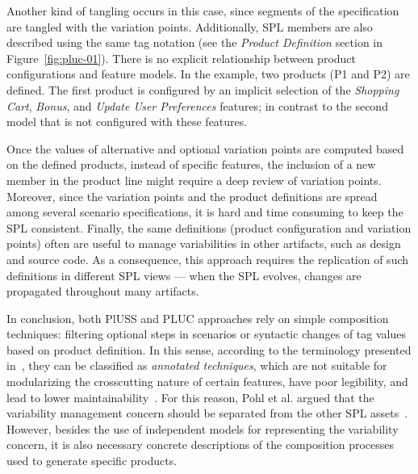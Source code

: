 \documentclass{acm_proc_article-sp}
\begin{document}
Another kind of tangling occurs in this case, since segments of the
specification are tangled with the variation points. Additionally, SPL members
are also described using the same tag notation (see the \emph{Product Definition}
section in Figure~\ref{fig:pluc-01}). There is no explicit relationship between
product configurations and feature models. In the example, two products (P1 and
P2) are defined. The first product is configured by an implicit selection of
the \emph{Shopping Cart}, \emph{Bonus}, and \emph{Update User Preferences}
features; in contrast to the second model that is not configured with these
features.

Once the values of alternative and optional variation points are computed based
on the defined products, instead of specific features, the inclusion of a new
member in the product line might require a deep review of variation points.
Moreover, since the variation points and the product definitions are spread among
several scenario specifications, it is hard and time consuming to keep the SPL
consistent. Finally, the same definitions (product configuration and variation
points) often are useful to manage variabilities in other artifacts, such as
design and source code. As a consequence, this approach requires the replication
of such definitions in different SPL views --- when the SPL evolves, changes are
propagated throughout many artifacts. 

In conclusion, both PlUSS and PLUC approaches rely on simple composition
techniques: filtering optional steps in scenarios or syntactic changes of tag
values based on product definition. In this sense, according to the terminology
presented in~\cite{}, they can be classified as \emph{annotated techniques},
which are not suitable for modularizing the crosscutting nature of certain
features, have poor legibility, and lead to lower
maintainability~\cite{Alves:2006aa}. For this reason, Pohl et al.
argued that the variability management concern should be separated from the other
SPL assets~\cite{Pohl:2005aa}. However, besides the use of independent models
for representing the variability concern, it is also necessary concrete
descriptions of the composition processes used to generate specific products.

% 
\end{document}
